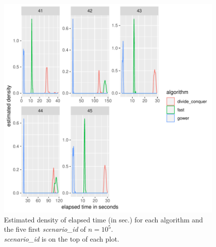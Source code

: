\documentclass[11pt]{report}
\begin{document}
\begin{figure}[h]
\centering
    \includegraphics[scale=2]{./images/elapsed_time_100000_part1.pdf}
    \caption{
    Estimated density of elapsed time (in sec.) for each algorithm and the five 
    first \textit{scenario\_id} of $n=10^5$.\\
    \textit{scenario\_id} is on the top of each plot.
    }
\end{figure}

\FloatBarrier
\end{document}
